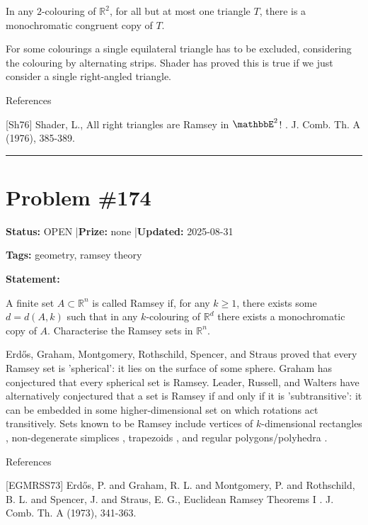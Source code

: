 \documentclass{article}
\begin{document}
In any $2$-colouring of $\mathbb{R}^2$, for all but at most one triangle $T$, there is a monochromatic congruent copy of $T$.




For some colourings a single equilateral triangle has to be excluded, considering the colouring by alternating strips. Shader \cite{Sh76} has proved this is true if we just consider a single right-angled triangle.




References

[Sh76] Shader, L., All right triangles are Ramsey in $\mathbbE^2$! . J. Comb. Th. A (1976), 385-389.

\noindent\rule{\linewidth}{0.4pt}


\section{Problem \#174}
\label{prob:174}

\noindent\textbf{Status:} OPEN \quad|\quad \textbf{Prize:} none \quad|\quad \textbf{Updated:} 2025-08-31

\noindent\textbf{Tags:} geometry, ramsey theory

\medskip

\noindent\textbf{Statement:}

A finite set $A\subset \mathbb{R}^n$ is called Ramsey if, for any $k\geq 1$, there exists some $d=d(A,k)$ such that in any $k$-colouring of $\mathbb{R}^d$ there exists a monochromatic copy of $A$. Characterise the Ramsey sets in $\mathbb{R}^n$.




Erd\H{o}s, Graham, Montgomery, Rothschild, Spencer, and Straus \cite{EGMRSS73} proved that every Ramsey set is 'spherical': it lies on the surface of some sphere. Graham has conjectured that every spherical set is Ramsey. Leader, Russell, and Walters \cite{LRW12} have alternatively conjectured that a set is Ramsey if and only if it is 'subtransitive': it can be embedded in some higher-dimensional set on which rotations act transitively. Sets known to be Ramsey include vertices of $k$-dimensional rectangles \cite{EGMRSS73}, non-degenerate simplices \cite{FrRo90}, trapezoids \cite{Kr92}, and regular polygons/polyhedra \cite{Kr91}.




References

[EGMRSS73] Erd\H{o}s, P. and Graham, R. L. and Montgomery, P. and Rothschild, B. L. and Spencer, J. and Straus, E. G., Euclidean Ramsey Theorems I . J. Comb. Th. A (1973), 341-363.
\end{document}
